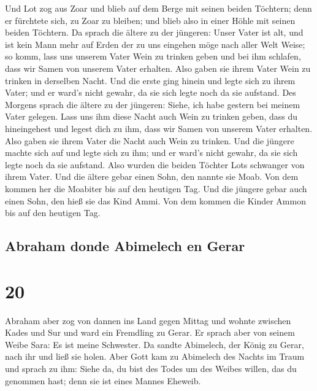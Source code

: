  Und Lot zog aus Zoar und blieb auf dem Berge mit seinen
beiden Töchtern; denn er fürchtete sich, zu Zoar zu bleiben; und blieb
also in einer Höhle mit seinen beiden Töchtern.  Da
sprach die ältere zu der jüngeren: Unser Vater ist alt, und ist kein
Mann mehr auf Erden der zu uns eingehen möge nach aller Welt Weise;
 so komm, lass uns unserem Vater Wein zu trinken geben
und bei ihm schlafen, dass wir Samen von unserem Vater erhalten.
 Also gaben sie ihrem Vater Wein zu trinken in derselben
Nacht. Und die erste ging hinein und legte sich zu ihrem Vater; und er
ward's nicht gewahr, da sie sich legte noch da sie aufstand.
 Des Morgens sprach die ältere zu der jüngeren: Siehe,
ich habe gestern bei meinem Vater gelegen. Lass uns ihm diese Nacht auch
Wein zu trinken geben, dass du hineingehest und legest dich zu ihm, dass
wir Samen von unserem Vater erhalten.  Also gaben sie
ihrem Vater die Nacht auch Wein zu trinken. Und die jüngere machte sich
auf und legte sich zu ihm; und er ward's nicht gewahr, da sie sich legte
noch da sie aufstand.  Also wurden die beiden Töchter
Lots schwanger von ihrem Vater.  Und die ältere gebar
einen Sohn, den nannte sie Moab. Von dem kommen her die Moabiter bis auf
den heutigen Tag.  Und die jüngere gebar auch einen Sohn,
den hieß sie das Kind Ammi. Von dem kommen die Kinder Ammon bis auf den
heutigen Tag.

\hypertarget{abraham-donde-abimelech-en-gerar}{%
\subsection{Abraham donde Abimelech en
Gerar}\label{abraham-donde-abimelech-en-gerar}}

\hypertarget{section-19}{%
\section{20}\label{section-19}}

 Abraham aber zog von dannen ins Land gegen Mittag und
wohnte zwischen Kades und Sur und ward ein Fremdling zu Gerar.
 Er sprach aber von seinem Weibe Sara: Es ist meine
Schwester. Da sandte Abimelech, der König zu Gerar, nach ihr und ließ
sie holen.  Aber Gott kam zu Abimelech des Nachts im Traum
und sprach zu ihm: Siehe da, du bist des Todes um des Weibes willen, das
du genommen hast; denn sie ist eines Mannes Eheweib.

